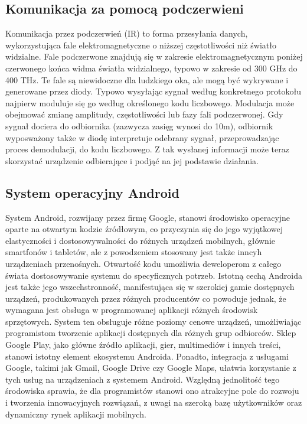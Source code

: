 \documentclass[12pt,twoside]{article}
\begin{document}
\subsection{Komunikacja za pomocą podczerwieni}
{Komunikacja przez podczerwień (IR) to forma przesyłania danych, wykorzystująca fale elektromagnetyczne
 o niższej częstotliwości niż światło widzialne. Fale podczerwone znajdują się w zakresie elektromagnetycznym 
 poniżej czerwonego końca widma światła widzialnego, typowo w zakresie od 300 GHz do 400 THz. Te fale są 
 niewidoczne dla ludzkiego oka, ale mogą być wykrywane i generowane przez diody. Typowo 
 wysyłając sygnał według konkretnego protokołu najpierw moduluje się go według określonego kodu liczbowego.
Modulacja może obejmować zmianę amplitudy, częstotliwości lub fazy fali podczerwonej. Gdy sygnał dociera do odbiornika 
(zazwycza zasięg wynosi do 10m), odbiornik wyposważony także w diodę interpretuje odebrany sygnał, przeprowadzając proces demodulacji, do kodu 
liczbowego. Z tak wysłanej informacji może teraz skorzystać urządzenie odbierające i podjąć na jej podstawie działania.}
\subsection{System operacyjny Android}
{System Android, rozwijany przez firmę Google, stanowi środowisko operacyjne oparte na otwartym kodzie źródłowym,
   co przyczynia się do jego wyjątkowej elastyczności i dostosowywalności do różnych urządzeń mobilnych, głównie 
   smartfonów i tabletów, ale z powodzeniem stosowany jest także inncyh urządzeniach przenośnych.
    Otwartość kodu umożliwia deweloperom z całego świata dostosowywanie systemu do specyficznych 
   potrzeb. Istotną cechą Androida jest także jego wszechstronność, manifestująca się w szerokiej gamie dostępnych 
   urządzeń, produkowanych przez różnych producentów co powoduje jednak, że wymagana jest obsługa w programowanej aplikacji różnych środowisk sprzętowych.
    System ten obsługuje różne poziomy cenowe urządzeń, umożliwiając 
   programistom tworzenie aplikacji dostępnych dla różnych grup odbiorców. Sklep Google Play, jako główne źródło 
   aplikacji, gier, multimediów i innych treści, stanowi istotny element ekosystemu Androida. Ponadto, integracja 
   z usługami Google, takimi jak Gmail, Google Drive czy Google Maps, ułatwia korzystanie z tych usług na urządzeniach 
   z systemem Android. Względną jednolitość tego środowiska sprawia, że dla programistów stanowi ono atrakcyjne pole do 
   rozwoju i tworzenia innowacyjnych rozwiązań, z uwagi na szeroką bazę użytkowników oraz dynamiczny rynek aplikacji mobilnych.}
\end{document}
